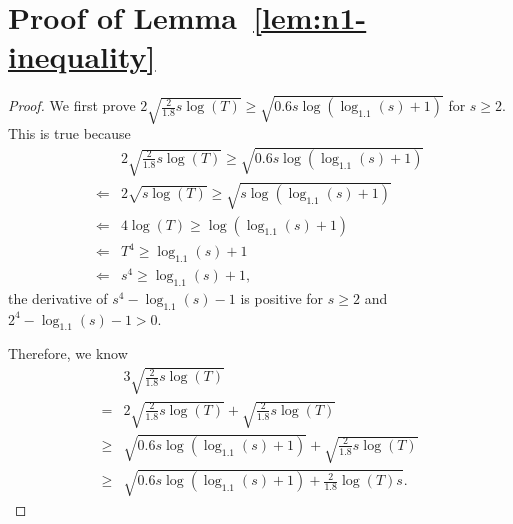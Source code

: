 \section*{Proof of Lemma~\ref{lem:n1-inequality}}

\begin{proof}
We first prove $2\sqrt{\frac{2}{1.8}s\log(T)}\geq \sqrt{0.6s\log(\log_{1.1}(s)+1)}$ for $s\geq 2$. This is true because
\begin{align}
&2\sqrt{\frac{2}{1.8}s\log(T)}\geq \sqrt{0.6s\log(\log_{1.1}(s)+1)} \nonumber \\
\Longleftarrow & 2\sqrt{s\log(T)}\geq \sqrt{s\log(\log_{1.1}(s)+1)} \nonumber \\
\Longleftarrow & 4\log(T)\geq \log(\log_{1.1}(s)+1) \nonumber \\
\Longleftarrow & T^4 \geq \log_{1.1}(s)+1 \nonumber \\
\Longleftarrow & s^4 \geq \log_{1.1}(s)+1, \nonumber
\end{align}
the derivative of $s^4-\log_{1.1}(s)-1$ is positive for $s\geq 2$ and $2^4-\log_{1.1}(s)-1>0$. 

Therefore, we know
\begin{align}
&3\sqrt{\frac{2}{1.8}s\log(T)} \nonumber \\
= & 2\sqrt{\frac{2}{1.8}s\log(T)} + \sqrt{\frac{2}{1.8}s\log(T)} \nonumber \\
\geq & \sqrt{0.6s\log(\log_{1.1}(s)+1)}+\sqrt{\frac{2}{1.8}s\log(T)} \nonumber \\
\geq & \sqrt{0.6s\log(\log_{1.1}(s)+1)+\frac{2}{1.8}\log(T)s}. \nonumber 
\end{align}

\end{proof}
